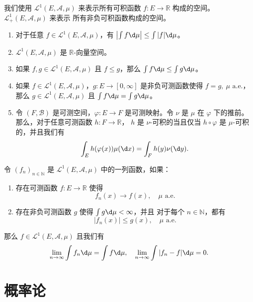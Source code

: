 \documentclass[fontset=none]{Notes}
\newcommand{\alev}[1]{\text{$#1$ a.e.}}
\begin{document}
我们使用 $\mathcal{L}^1(E,\mathcal{A},\mu)$ 来表示所有可积函数
$f:E\to \mathbb{R}$ 构成的空间。$\mathcal{L}_+^1(E,\mathcal{A},\mu)$ 来表示
所有非负可积函数构成的空间。

\begin{proposition}[可积函数的性质]
  \mbox{}
  \begin{enumerate}
    \item 对于任意 $f\in \mathcal{L}^1(E,\mathcal{A},\mu)$，有
    $\bigl|\int f\d\mu\bigr|\leq \int |f|\d\mu$。
    \item $\mathcal{L}^1(E,\mathcal{A},\mu)$ 是 $\mathbb{R}$-向量空间。
    \item 如果 $f,g\in \mathcal{L}^1(E,\mathcal{A},\mu)$ 且
    $f\leq g$，那么 $\int f\d\mu\leq \int g\d\mu$。
    \item 如果 $f\in \mathcal{L}^1(E,\mathcal{A},\mu)$，$g:E\to [0,\infty]$
    是非负可测函数使得 $f=g,\ \alev{\mu}$，那么
    $g\in \mathcal{L}^1(E,\mathcal{A},\mu)$ 且 $\int f\d\mu=\int g\d\mu$。
    \item 令 $(F,\mathcal{B})$ 是可测空间，$\varphi:E\to F$ 是可测映射。令
    $\nu$ 是 $\mu$ 在 $\varphi$ 下的推前。那么，对于任意可测函数 $h:F\to \mathbb{R}$，
    $h$ 是 $\nu$-可积的当且仅当 $h\circ\varphi$ 是 $\mu$-可积的，并且我们有
    \[
      \int_Eh(\varphi(x))\mu(\d x)=\int_Fh(y)\nu(\d y).
    \]
  \end{enumerate}
\end{proposition}

\begin{theorem}[控制收敛定理]
  令 $(f_n)_{n\in \mathbb{N}}$ 是 $\mathcal{L}^1(E,\mathcal{A},\mu)$
  中的一列函数，如果：
  \begin{enumerate}
    \item 存在可测函数 $f:E\to \mathbb{R}$ 使得
    \[
      f_n(x)\to f(x),\quad\alev{\mu}  
    \]
    \item 存在非负可测函数 $g$ 使得 $\int g\d\mu<\infty$，并且
    对于每个 $n\in \mathbb{N}$，都有
    \[
      |f_n(x)|\leq g(x),\quad \alev{\mu}   
    \]
  \end{enumerate}
  那么 $f\in \mathcal{L}^1(E,\mathcal{A},\mu)$ 且我们有
  \[
    \lim_{n\to\infty}\int f_n\d\mu=\int f\d\mu,\quad
    \lim_{n\to\infty}\int |f_n-f|\d\mu=0.  
  \]
\end{theorem}




 

\part{概率论}
\end{document}
